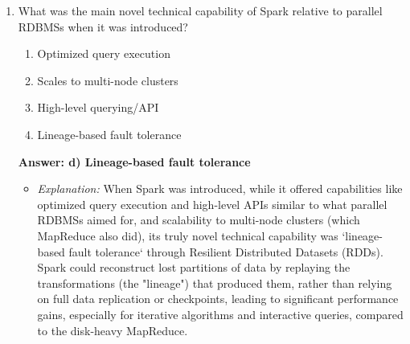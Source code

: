 \documentclass{article}
\begin{document}
\begin{enumerate}[label=\textbf{Question \arabic*.}]
    \item What was the main novel technical capability of Spark relative to parallel RDBMSs when it was introduced?
        \begin{enumerate}[label=\alph*)]
            \item Optimized query execution
            \item Scales to multi-node clusters
            \item High-level querying/API
            \item Lineage-based fault tolerance
        \end{enumerate}
        \textbf{Answer: d) Lineage-based fault tolerance}
        \begin{itemize}
            \item \textit{Explanation:} When Spark was introduced, while it offered capabilities like optimized query execution and high-level APIs similar to what parallel RDBMSs aimed for, and scalability to multi-node clusters (which MapReduce also did), its truly novel technical capability was `lineage-based fault tolerance` through Resilient Distributed Datasets (RDDs). Spark could reconstruct lost partitions of data by replaying the transformations (the "lineage") that produced them, rather than relying on full data replication or checkpoints, leading to significant performance gains, especially for iterative algorithms and interactive queries, compared to the disk-heavy MapReduce.
        \end{itemize}
    

\end{enumerate}
\end{document}
